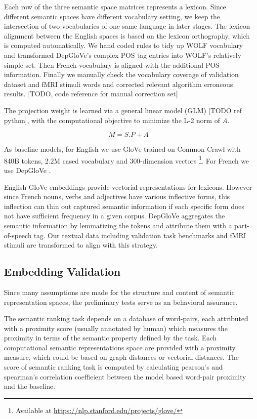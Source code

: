 Each row of the three semantic space matrices represents a lexicon. Since different semantic spaces have different vocabulary setting, we keep the intersection of two vocabularies of one same language in later stages. The lexicon alignment between the English spaces is based on the lexicon orthography, which is computed automatically. We hand coded rules to tidy up WOLF vocabulary and transformed DepGloVe's complex POS tag entries into WOLF's relatively simple set. Then French vocabulary is aligned with the additional POS information. Finally we manually check the vocabulary coverage of validation dataset and fMRI stimuli words and corrected relevant algorithm erroneous results. [TODO, code reference for manual correction set] %

The projection weight is learned via a general linear model (GLM) [TODO ref python], with the computational objective to minimize the L-2 norm of \(A\).

\begin{equation}
M = S.P + A
\label{eqn:linearmixture}
\end{equation}

As baseline models, for English we use GloVe \parencite{penningtonGloveGlobalVectors2014} trained on Common Crawl with 840B tokens, 2.2M cased vocabulary and 300-dimension vectors \footnote{Available at \url{https://nlp.stanford.edu/projects/glove/}}. For French we use DepGloVe \parencite{delaclergerieDepGloveSmallServer}. 

English GloVe embeddings provide vectorial representations for lexicons. However since French nouns, verbs and adjectives have various inflective forms, this inflection can thin out captured semantic information if each specific form does not have sufficient frequency in a given corpus. DepGloVe aggregates the semantic information by lemmatizing the tokens and attribute them with a part-of-speech tag. Our textual data including validation task benchmarks and fMRI stimuli are transformed to align with this strategy. 

\subsection{Embedding Validation}

Since many assumptions are made for the structure and content of semantic representation spaces, the preliminary tests serve as an behavioral assurance. 

The semantic ranking task depends on a database of word-pairs, each attributed with a proximity score (usually annotated by human) which measures the proximity in terms of the semantic property defined by the task. Each computational semantic representations space are provided with a proximity measure, which could be based on graph distances or vectorial distances. The score of semantic ranking task is computed by calculating pearson's and spearman's correlation coefficient  between the model based word-pair proximity and the baseline. 

